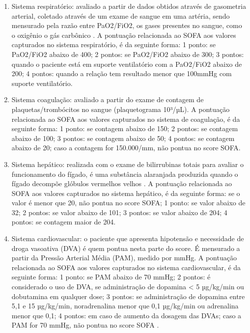 \documentclass[12pt]{article}
\begin{document}
\begin{enumerate}
    \item Sistema respiratório: avaliado a partir de dados obtidos através de gasometria arterial, coletado através de um exame de sangue em uma artéria, sendo mensurado pela razão entre PaO2/FiO2, os gases presentes no sangue, como o oxigênio o gás carbônico \cite{mota2010disturbios}. A pontuação relacionada ao SOFA aos valores capturados no sistema respiratório, é da seguinte forma: 1 ponto: se PaO2/FiO2 abaixo de 400; 2 pontos: se PaO2/FiO2 abaixo de 300; 3 pontos: quando o paciente está em suporte ventilatório com a PaO2/FiO2 abaixo de 200; 4 pontos: quando a relação tem resultado menor que 100mmHg com suporte ventilatório.
    
    \item Sistema coagulação: avaliado a partir do exame de contagem de plaquetas/trombócitos no sangue (plaquetograma 10³/µL). A pontuação relacionada ao SOFA aos valores capturados no sistema de coagulação, é da seguinte forma: 1 ponto: se contagem abaixo de 150; 2 pontos: se contagem abaixo de 100; 3 pontos: se contagem abaixo de 50; 4 pontos: se contagem abaixo de 20; caso a contagem for 150.000/mm, não pontua no score SOFA.
    
    \item Sistema hepático: realizada com o exame de bilirrubinas totais para avaliar o funcionamento do fígado, é uma substância alaranjada produzida quando o fígado decompõe glóbulos vermelhos velhos \cite{lambden2019sofa}. A pontuação relacionada ao SOFA aos valores capturados no sistema hepático, é da seguinte forma:  se o valor é menor que 20, não pontua no score SOFA; 1 ponto: se valor abaixo de 32; 2 pontos: se valor abaixo de 101; 3 pontos: se valor abaixo de 204; 4 pontos: se contagem maior de 204.
    
    \item Sistema cardiovascular: o paciente que apresenta hipotensão e necessidade de droga vasoativa (DVA) é quem pontua nesta parte do score. É mensurado a partir da Pressão Arterial Média (PAM), medido por mmHg. A pontuação relacionada ao SOFA aos valores capturados no sistema cardiovascular, é da seguinte forma: 1 ponto: se PAM abaixo de 70 mmHg; 2 pontos: é considerado o uso de DVA, se administração de dopamina < 5 µg/kg/min ou dobutamina em qualquer dose; 3 pontos: se administração de dopamina entre 5,1 e 15 µg/kg/min, noradrenalina menor que 0,1 µg/kg/min ou adrenalina menor que 0,1; 4 pontos: em caso de aumento da dosagem das DVAs; caso a PAM for 70 mmHg, não pontua no score SOFA \cite{nakashima2020intervindo}. 
    

\end{enumerate}
\end{document}
